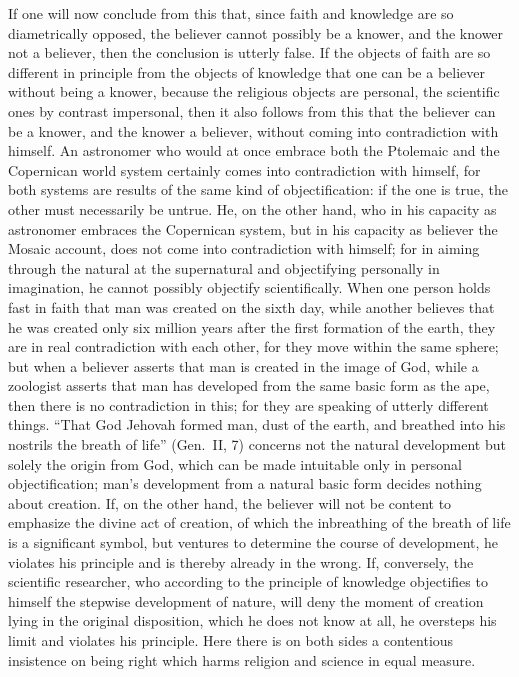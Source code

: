 \documentclass[12pt,a4paper]{article}
\newcommand{\opage}[1]{\marginnote{\footnotesize\textit{[#1]}}}
\begin{document}
If one will now conclude from this that, since faith and knowledge are
so diametrically opposed, the believer cannot possibly be a knower, and
the knower not a believer, then the conclusion is utterly false. If the
objects of faith are so different in principle from the objects of
knowledge that one can be a believer without being a knower, because the
religious objects are personal, the scientific ones by contrast
impersonal, then it also follows from this that the believer can be a
knower, and the knower a believer, without coming into contradiction with
himself. An astronomer who would at once embrace both the Ptolemaic and
the Copernican world system certainly comes into contradiction with
himself, for both systems are results of the same kind of
objectification: if the one is true, the other must necessarily be
untrue. He, on the other hand, who in his capacity as astronomer
embraces the Copernican system, but in his capacity as believer the
Mosaic account, does not come into contradiction with himself; for in
aiming through the natural at the supernatural and objectifying
personally in imagination, he cannot possibly objectify scientifically.
When one person holds fast in faith that man was created on the sixth
day, while another believes that he was created only six million years
after the first formation of the earth, they are in real contradiction
with each other, for they move within the same sphere; but when a
believer asserts that man is created in the image of God, while a
zoologist asserts that man has developed from the same basic form as the
ape, then there is no contradiction in this; for they are speaking of
utterly different things. ``That God Jehovah formed man, dust of the
earth, and breathed into his nostrils the breath of life'' (Gen.\ II, 7)
concerns not the natural development but solely the origin from God,
which can be made intuitable only in personal objectification; man's
development from a natural basic form decides nothing about creation.
If, on the other hand, the believer will not be content to emphasize the
\opage{53}divine act of creation, of which the inbreathing of the breath of life
is a significant symbol, but ventures to determine the course of
development, he violates his principle and is thereby already in the
wrong. If, conversely, the scientific researcher, who according to the
principle of knowledge objectifies to himself the stepwise development of
nature, will deny the moment of creation lying in the original
disposition, which he does not know at all, he oversteps his limit and
violates his principle. Here there is on both sides a contentious
insistence on being right which harms religion and science in equal
measure.
\end{document}
